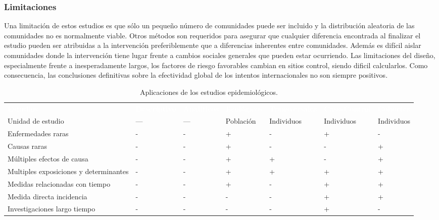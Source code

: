 \subsubsection{Limitaciones}
Una limitación de estos estudios es que sólo un pequeño número de comunidades puede ser incluido y la distribución aleatoria de las comunidades no es normalmente viable. Otros métodos son requeridos para asegurar que cualquier diferencia encontrada al finalizar el estudio pueden ser atribuidas a la intervención preferiblemente que a diferencias inherentes entre comunidades. Además es difícil aislar comunidades donde la intervención tiene lugar frente a cambios sociales generales que pueden estar ocurriendo. Las limitaciones del diseño, especialmente frente a inesperadamente largos, los factores de riesgo favorables cambian en sitios control, siendo dificil calcularlos. Como consecuencia, las conclusiones definitivas sobre la efectividad global de los intentos internacionales no son siempre positivos.
\begin{table}[H]
	\centering
	\begin{tabular}{M{2.15cm}N{2.15cm}N{1.8cm}N{2cm}N{2.5cm}N{1.8cm}N{2cm}}
		\textcolor{white}{\textbf{Estudios}}&\textcolor{white}{\textbf{Descriptivo}}&\textcolor{white}{\textbf{Analíticos}}&\textcolor{white}{\textbf{Ecológicos}}&\textcolor{white}{\textbf{Transversales}}&\textcolor{white}{\textbf{Caso-Control}}&\textcolor{white}{\textbf{Cohortes}}\\
		Unidad de estudio&---&---&Población&Individuos&Individuos&Individuos\\
		Enfermedades raras&-&-&+&-&+&-\\
		Causas raras&-&-&+&-&-&+\\
		Múltiples efectos de causa&-&-&+&+&-&+\\
		Multiples exposiciones y determinantes&-&-&+&+&+&+\\
		Medidas relacionadas con tiempo&-&-&+&-&+&+\\
		Medida directa incidencia&-&-&-&-&+&+\\
		Investigaciones largo tiempo&-&-&-&-&+&-\\
		\hline
	\end{tabular}
	\caption{Aplicaciones de los estudios epidemiológicos.}
\end{table}
